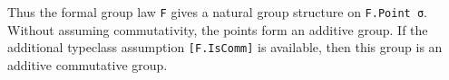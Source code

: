 Thus the formal group law \lstinline|F| gives a natural group structure
on \lstinline|F.Point σ|.  Without assuming commutativity, the points form
an additive group.  If the additional typeclass assumption
\lstinline|[F.IsComm]| is available, then this group is an additive
commutative group.










